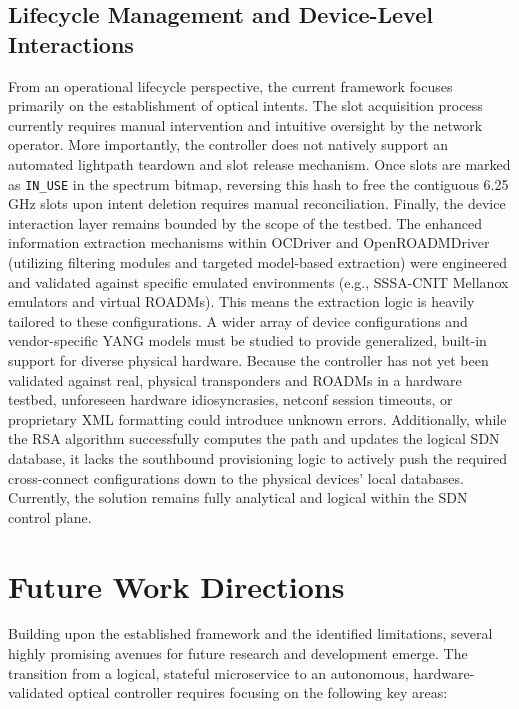 \subsection*{\small Lifecycle Management and Device-Level Interactions}
From an operational lifecycle perspective, the current framework focuses primarily on the establishment of optical intents. The slot acquisition process currently requires manual intervention and intuitive oversight by the network operator. More importantly, the controller does not natively support an automated lightpath teardown and slot release mechanism. Once slots are marked as \texttt{IN\_USE} in the spectrum bitmap, reversing this hash to free the contiguous 6.25 GHz slots upon intent deletion requires manual reconciliation. Finally, the device interaction layer remains bounded by the scope of the testbed. The enhanced information extraction mechanisms within OCDriver and OpenROADMDriver (utilizing filtering modules and targeted model-based extraction) were engineered and validated against specific emulated environments (e.g., SSSA-CNIT Mellanox emulators and virtual ROADMs). This means the extraction logic is heavily tailored to these configurations. A wider array of device configurations and vendor-specific YANG models must be studied to provide generalized, built-in support for diverse physical hardware. Because the controller has not yet been validated against real, physical transponders and ROADMs in a hardware testbed, unforeseen hardware idiosyncrasies, netconf session timeouts, or proprietary XML formatting could introduce unknown errors. Additionally, while the RSA algorithm successfully computes the path and updates the logical SDN database, it lacks the southbound provisioning logic to actively push the required cross-connect configurations down to the physical devices' local databases. Currently, the solution remains fully analytical and logical within the SDN control plane.
\section{Future Work Directions}
Building upon the established framework and the identified limitations, several highly promising avenues for future research and development emerge. The transition from a logical, stateful microservice to an autonomous, hardware-validated optical controller requires focusing on the following key areas:
